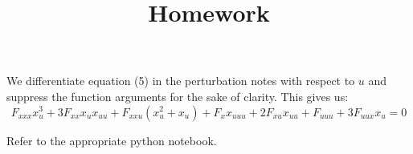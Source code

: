 \documentclass[12pt]{article}
\title{Homework}
\newenvironment{problem}[2][Problem]{\begin{trivlist}
\item[\hskip \labelsep {\bfseries #1}\hskip \labelsep {\bfseries #2}]}{\end{trivlist}}
\begin{document}
\begin{problem}{1.} 
We differentiate equation (5) in the perturbation notes with respect to $u$ and suppress the function arguments for the sake of clarity. This gives us: 
$$F_{xxx}x_u^3 + 3 F_{xx}x_ux_{uu} + F_{xxu}(x_u^2 + x_u) + F_xx_{uuu} + 2F_{xu}x_{uu} + F_{uuu} + 3 F_{uux}x_u = 0$$
\end{problem}

\begin{problem}{2-5.} 
Refer to the appropriate python notebook.
\end{problem}
\end{document}

